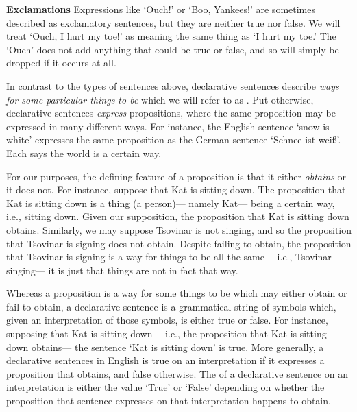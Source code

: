 \textbf{Exclamations} Expressions like `Ouch!' or `Boo, Yankees!' are sometimes described as exclamatory sentences, but they are neither true nor false.
We will treat `Ouch, I hurt my toe!' as meaning the same thing as `I hurt my toe.'
The `Ouch' does not add anything that could be true or false, and so will simply be dropped if it occurs at all.


In contrast to the types of sentences above, declarative sentences describe \textit{ways for some particular things to be} which we will refer to as .
Put otherwise, declarative sentences \textit{express} propositions, where the same proposition may be expressed in many different ways.
For instance, the English sentence `snow is white' expresses the same proposition as the German sentence `Schnee ist wei\ss'.
Each says the world is a certain way.

For our purposes, the defining feature of a proposition is that it either \textit{obtains} or it does not.
For instance, suppose that Kat is sitting down.
The proposition that Kat is sitting down is a thing (a person)--- namely Kat--- being a certain way, i.e., sitting down.
Given our supposition, the proposition that Kat is sitting down obtains.
Similarly, we may suppose Tsovinar is not singing, and so the proposition that Tsovinar is signing does not obtain.
Despite failing to obtain, the proposition that Tsovinar is signing is a way for things to be all the same--- i.e., Tsovinar singing--- it is just that things are not in fact that way.

Whereas a proposition is a way for some things to be which may either obtain or fail to obtain, a declarative sentence is a grammatical string of symbols which, given an interpretation of those symbols, is either true or false.
For instance, supposing that Kat is sitting down--- i.e., the proposition that Kat is sitting down obtains--- the sentence `Kat is sitting down' is true.
More generally, a declarative sentences in English is true on an interpretation if it expresses a proposition that obtains, and false otherwise.
The  of a declarative sentence on an interpretation is either the value `True' or `False' depending on whether the proposition that sentence expresses on that interpretation happens to obtain.

